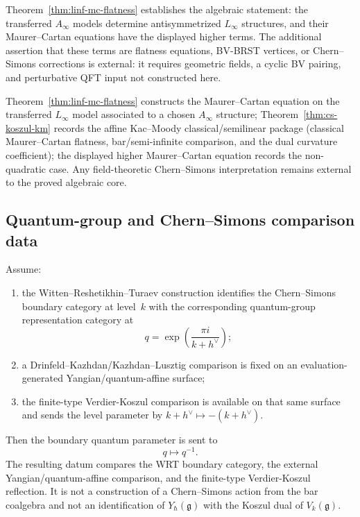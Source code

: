 \label{thm:cs-koszul-general}%
\label{eq:deformed-cs-general}%

\begin{remark}
\label{rem:cs-koszul-external}
Theorem~\ref{thm:linf-mc-flatness} establishes the algebraic statement:
the transferred
$A_\infty$ models determine antisymmetrized $L_\infty$ structures,
and their Maurer--Cartan equations
have the displayed higher terms.  The additional assertion that
these terms are flatness equations, BV-BRST vertices, or
Chern--Simons corrections is external: it requires geometric fields,
a cyclic BV pairing, and perturbative QFT input not constructed here.
\end{remark}

\begin{remark}[Scope]
Theorem~\ref{thm:linf-mc-flatness} constructs the Maurer--Cartan
equation on the transferred $L_\infty$ model associated to a chosen
$A_\infty$ structure; Theorem~\ref{thm:cs-koszul-km}
records the affine Kac--Moody classical/semilinear package
\textup{(}classical Maurer--Cartan flatness, bar/semi-infinite
comparison, and the dual curvature coefficient\textup{)};
the displayed higher Maurer--Cartan equation records the
non-quadratic case. Any
field-theoretic Chern--Simons interpretation remains external
to the proved algebraic core.
\end{remark}

\subsection{Quantum-group and Chern--Simons comparison data}

\begin{conjecture}\label{conj:wrt-conjecture}
Assume:
\begin{enumerate}[label=\textup{(W\arabic*)}]
\item the Witten--Reshetikhin--Turaev construction identifies
the Chern--Simons boundary category at level~$k$ with the
corresponding quantum-group representation category at
\[
 q=\exp\!\left(\frac{\pi i}{k+h^\vee}\right);
\]
\item a Drinfeld--Kazhdan/Kazhdan--Lusztig comparison is fixed on an
evaluation-generated Yangian/quantum-affine surface;
\item the finite-type Verdier-Koszul comparison is available on that
same surface and sends the level parameter by
$k+h^\vee\mapsto -(k+h^\vee)$.
\end{enumerate}
Then the boundary quantum parameter is sent to
\[
 q \longmapsto q^{-1}.
\]
The resulting datum compares the WRT boundary category, the external
Yangian/quantum-affine comparison, and the finite-type
Verdier-Koszul reflection.  It is not a construction of a
Chern--Simons action from the bar coalgebra and not an identification
of $Y_\hbar(\mathfrak g)$ with the Koszul dual of
$V_k(\mathfrak g)$.
\end{conjecture}

